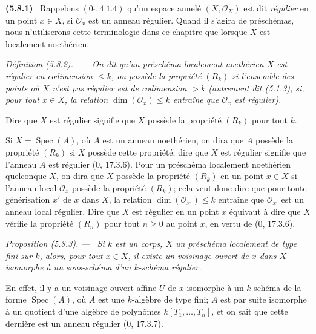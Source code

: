 \documentclass[10pt,oneside]{book}
\newenvironment{env}[1][]{\par\medskip\noindent\textbf{(#1)}\ }{\par}
\newenvironment{definition}[1][]{%
  \par\medskip\noindent\itshape Définition (#1). ---\ }{\par}
\newenvironment{proposition}[1][]{%
  \par\medskip\noindent\itshape Proposition (#1). ---\ }{\par}
\begin{document}
\begin{env}[5.8.1]
\label{IV.2.s5.8.1-fr}
Rappelons $(0_{\mathrm I},4.1.4)$ qu'un espace annelé
$(X,\mathcal O_X)$ est dit \emph{régulier} en un point $x\in X$, si
$\mathcal O_x$ est un anneau régulier. Quand il s'agira de préschémas, nous
n'utiliserons cette terminologie dans ce chapitre que lorsque $X$ est
localement noethérien.
\end{env}

\begin{definition}[5.8.2]
\label{IV.2.s5.8.2-fr}
On dit qu'un préschéma localement noethérien $X$ est régulier en codimension
$\leq k$, ou possède la propriété $(R_k)$ si l'ensemble des points où $X$
n'est pas régulier est de codimension $>k$ (autrement dit (5.1.3), si, pour
tout $x\in X$, la relation $\dim(\mathcal O_x)\leq k$ entraîne que
$\mathcal O_x$ est régulier).
\end{definition}

Dire que $X$ est régulier signifie que $X$ possède la propriété $(R_k)$ pour
tout $k$.

Si $X=\operatorname{Spec}(A)$, où $A$ est un anneau noethérien, on dira que
$A$ possède la propriété $(R_k)$ si $X$ possède cette propriété; dire que
$X$ est régulier signifie que l'anneau $A$ est régulier (0, 17.3.6). Pour un
préschéma localement noethérien quelconque $X$, on dira que $X$ possède la
propriété $(R_k)$ en un point $x\in X$ si l'anneau local $\mathcal O_x$
possède la propriété $(R_k)$; cela veut donc dire que pour toute générisation
$x'$ de $x$ dans $X$, la relation $\dim(\mathcal O_{x'})\leq k$ entraîne que
$\mathcal O_{x'}$ est un anneau local régulier. Dire que $X$ est régulier en
un point $x$ équivaut à dire que $X$ vérifie la propriété $(R_n)$ pour tout
$n\geq0$ au point $x$, en vertu de (0, 17.3.6).

\begin{proposition}[5.8.3]
\label{IV.2.s5.8.3-fr}
Si $k$ est un corps, $X$ un préschéma localement de type fini sur $k$, alors,
pour tout $x\in X$, il existe un voisinage ouvert de $x$ dans $X$ isomorphe à
un sous-schéma d'un $k$-schéma régulier.
\end{proposition}

En effet, il y a un voisinage ouvert affine $U$ de $x$ isomorphe à un
$k$-schéma de la forme $\operatorname{Spec}(A)$, où $A$ est une $k$-algèbre
de type fini; $A$ est par suite isomorphe à un quotient d'une algèbre de
polynômes $k[T_1,\ldots,T_n]$, et on sait que cette dernière est un anneau
régulier (0, 17.3.7).
\end{document}
